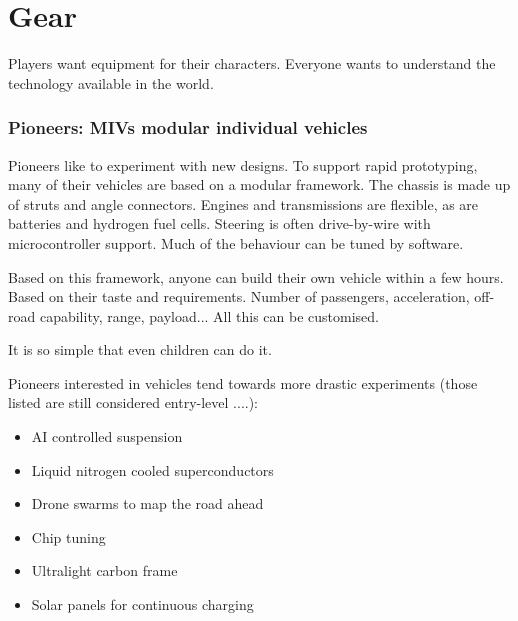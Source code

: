 \chapter{Gear}

Players want equipment for their characters. Everyone wants to understand the technology available in the world.




\subsection{Pioneers: MIVs modular individual vehicles}

Pioneers like to experiment with new designs. To support rapid prototyping, many of their vehicles are based on a modular framework. The chassis is made up of struts and angle connectors. Engines and transmissions are flexible, as are batteries and hydrogen fuel cells. Steering is often drive-by-wire with microcontroller support. Much of the behaviour can be tuned by software.

Based on this framework, anyone can build their own vehicle within a few hours. Based on their taste and requirements. Number of passengers, acceleration, off-road capability, range, payload... All this can be customised.

It is so simple that even children can do it.

Pioneers interested in vehicles tend towards more drastic experiments (those listed are still considered entry-level ....):

\begin{itemize}
    \item AI controlled suspension
    \item Liquid nitrogen cooled superconductors
    \item Drone swarms to map the road ahead
    \item Chip tuning
    \item Ultralight carbon frame
    \item Solar panels for continuous charging
\end{itemize}


